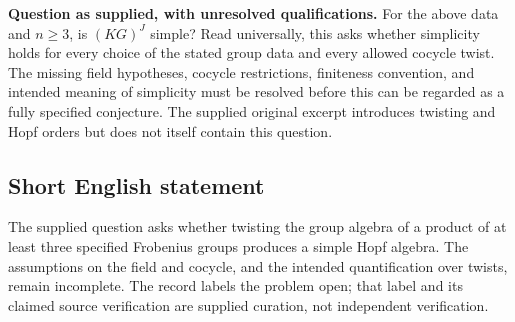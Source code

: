 \documentclass[11pt]{article}
\begin{document}
\textbf{Question as supplied, with unresolved qualifications.} For the above data and \(n\geq3\), is \((KG)^J\) simple? Read universally, this asks whether simplicity holds for every choice of the stated group data and every allowed cocycle twist. The missing field hypotheses, cocycle restrictions, finiteness convention, and intended meaning of simplicity must be resolved before this can be regarded as a fully specified conjecture. The supplied original excerpt introduces twisting and Hopf orders but does not itself contain this question.
\subsection{Short English statement}
The supplied question asks whether twisting the group algebra of a product of at least three specified Frobenius groups produces a simple Hopf algebra. The assumptions on the field and cocycle, and the intended quantification over twists, remain incomplete. The record labels the problem open; that label and its claimed source verification are supplied curation, not independent verification.
\end{document}
